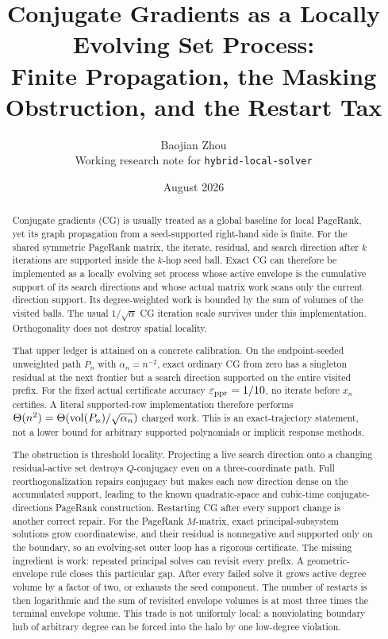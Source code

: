 \documentclass[11pt]{article}
\title{Conjugate Gradients as a Locally Evolving Set Process:\\
Finite Propagation, the Masking Obstruction, and the Restart Tax}
\author{Baojian Zhou\\
\small Working research note for \texttt{hybrid-local-solver}}
\date{August 2026}
\begin{document}
\maketitle

\begin{abstract}
Conjugate gradients (CG) is usually treated as a global baseline for local
PageRank, yet its graph propagation from a seed-supported right-hand side is
finite. For the shared symmetric PageRank matrix, the iterate, residual, and
search direction after $k$ iterations are supported inside the $k$-hop seed
ball. Exact CG can therefore be implemented as a locally evolving set process
whose active envelope is the cumulative support of its search directions and
whose actual matrix work scans only the current direction support. Its
degree-weighted work is bounded by the sum of volumes of the visited balls.
The usual $1/\sqrt\alpha$ CG iteration scale survives under this
implementation. Orthogonality does not destroy spatial locality.

That upper ledger is attained on a concrete calibration.  On the
endpoint-seeded unweighted path $P_n$ with $\alpha_n=n^{-2}$, exact ordinary
CG from zero has a singleton residual at the next frontier but a search
direction supported on the entire visited prefix.  For the fixed actual
certificate accuracy $\varepsilon_{\mathrm{ppr}}=1/10$, no iterate before $x_n$ certifies.  A
literal supported-row implementation therefore performs
$\Theta(n^2)=\Theta(\operatorname{vol}(P_n)/\sqrt{\alpha_n})$ charged work.  This is an
exact-trajectory statement, not a lower bound for arbitrary supported
polynomials or implicit response methods.

The obstruction is threshold locality. Projecting a live search direction
onto a changing residual-active set destroys $Q$-conjugacy even on a
three-coordinate path. Full reorthogonalization repairs conjugacy but makes
each new direction dense on the accumulated support, leading to the known
quadratic-space and cubic-time conjugate-directions PageRank construction.
Restarting CG after every support change is another correct repair. For the
PageRank $M$-matrix, exact principal-subsystem solutions grow coordinatewise,
and their residual is nonnegative and supported only on the boundary, so an
evolving-set outer loop has a rigorous certificate. The missing ingredient is
work: repeated principal solves can revisit every prefix. A geometric-envelope
rule closes this particular gap. After every failed solve it grows active
degree volume by a factor of two, or exhausts the seed component. The number
of restarts is then logarithmic and the sum of revisited envelope volumes is
at most three times the terminal envelope volume. This trade is not uniformly
local: a nonviolating boundary hub of arbitrary degree can be forced into the
halo by one low-degree violation.


\end{abstract}
\end{document}
